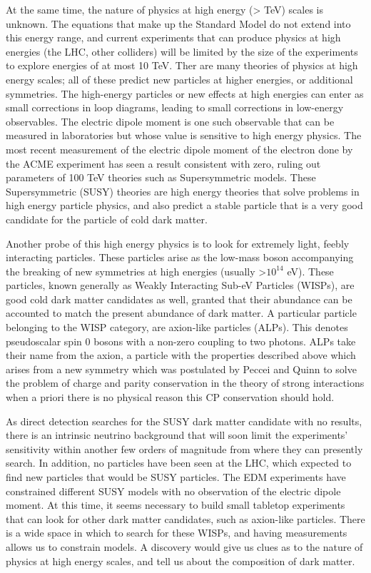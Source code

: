 \documentclass[12pt, twoside]{book}
\begin{document}
At the same time, the nature of physics at high energy (> TeV) scales is unknown. The equations that make up the Standard Model do not extend into this energy range, and current experiments that can produce physics at high energies (the LHC, other colliders) will be limited by the size of the experiments to explore energies of at most 10 TeV. Ther are many theories of physics at high energy scales; all of these predict new particles at higher energies, or additional symmetries. The high-energy particles or new effects at high energies can enter as small corrections in loop diagrams, leading to small corrections in low-energy observables. The electric dipole moment is one such observable that can be measured in laboratories but whose value is sensitive to high energy physics. The most recent measurement of the electric dipole moment of the electron \cite{acme14} done by the ACME experiment has seen a result consistent with zero, ruling out parameters of 100 TeV theories such as Supersymmetric models. These Supersymmetric (SUSY) theories are high energy theories that solve problems in high energy particle physics, and also predict a stable particle that is a very good candidate for the particle of cold dark matter.

Another probe of this high energy physics is to look for extremely light, feebly interacting particles. These particles arise as the low-mass boson accompanying the breaking of new symmetries at high energies (usually >$10^{14}$ eV). These particles, known generally as Weakly Interacting Sub-eV Particles (WISPs), are good cold dark matter candidates as well, granted that their abundance can be accounted to match the present abundance of dark matter. A particular particle belonging to the WISP category, are axion-like particles (ALPs). This denotes pseudoscalar spin 0 bosons with a non-zero coupling to two photons. ALPs take their name from the axion, a particle with the properties described above which arises from a new symmetry which was postulated by Peccei and Quinn \cite{peccei77} to solve the problem of charge and parity conservation in the theory of strong interactions when a priori there is no physical reason this CP conservation should hold.

As direct detection searches for  the SUSY dark matter candidate with no results, there is an intrinsic neutrino background that will soon limit the experiments' sensitivity within another few orders of magnitude from where they can presently search. In addition, no particles have been seen at the LHC, which expected to find new particles that would be SUSY particles. The EDM experiments have constrained different SUSY models with no observation of the electric dipole moment. At this time, it seems necessary to build small tabletop experiments that can look for other dark matter candidates, such as axion-like particles. There is a wide space in which to search for these WISPs, and having measurements allows us to constrain models. A discovery would give us clues as to the nature of physics at high energy scales, and tell us about the composition of dark matter.
\end{document}
